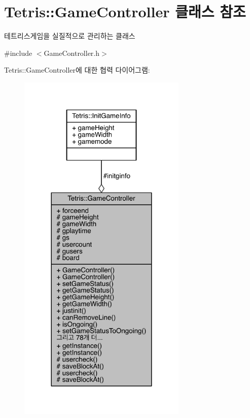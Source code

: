 \hypertarget{class_tetris_1_1_game_controller}{}\section{Tetris\+:\+:Game\+Controller 클래스 참조}
\label{class_tetris_1_1_game_controller}


테트리스게임을 실질적으로 관리하는 클래스  




{\ttfamily \#include $<$Game\+Controller.\+h$>$}



Tetris\+:\+:Game\+Controller에 대한 협력 다이어그램\+:
\nopagebreak
\begin{figure}[H]
\begin{center}
\leavevmode
\includegraphics[width=228pt]{class_tetris_1_1_game_controller__coll__graph}
\end{center}
\end{figure}
